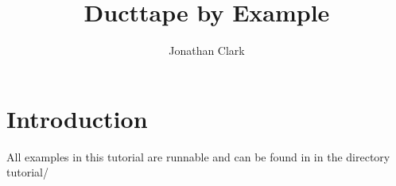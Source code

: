 \documentclass[10pt]{article}
\title{\textbf{Ducttape} by Example}
\author{Jonathan Clark}
\date{}
\begin{document}
\thispagestyle{empty}
\maketitle

\tableofcontents

\section{Introduction}

All examples in this tutorial are runnable and can be found in in the directory tutorial/
\end{document}
